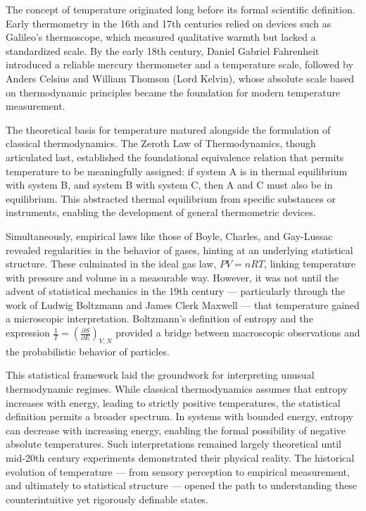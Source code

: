 \begin{historical}
The concept of temperature originated long before its formal scientific definition. Early thermometry in the 16th and 17th centuries relied on devices such as Galileo’s thermoscope, which measured qualitative warmth but lacked a standardized scale. By the early 18th century, Daniel Gabriel Fahrenheit introduced a reliable mercury thermometer and a temperature scale, followed by Anders Celsius and William Thomson (Lord Kelvin), whose absolute scale based on thermodynamic principles became the foundation for modern temperature measurement.

The theoretical basis for temperature matured alongside the formulation of classical thermodynamics. The Zeroth Law of Thermodynamics, though articulated last, established the foundational equivalence relation that permits temperature to be meaningfully assigned: if system A is in thermal equilibrium with system B, and system B with system C, then A and C must also be in equilibrium. This abstracted thermal equilibrium from specific substances or instruments, enabling the development of general thermometric devices.

Simultaneously, empirical laws like those of Boyle, Charles, and Gay-Lussac revealed regularities in the behavior of gases, hinting at an underlying statistical structure. These culminated in the ideal gas law, \( PV = nRT \), linking temperature with pressure and volume in a measurable way. However, it was not until the advent of statistical mechanics in the 19th century — particularly through the work of Ludwig Boltzmann and James Clerk Maxwell — that temperature gained a microscopic interpretation. Boltzmann’s definition of entropy and the expression \( \frac{1}{T} = \left(\frac{\partial S}{\partial E}\right)_{V,N} \) provided a bridge between macroscopic observations and the probabilistic behavior of particles.

This statistical framework laid the groundwork for interpreting unusual thermodynamic regimes. While classical thermodynamics assumes that entropy increases with energy, leading to strictly positive temperatures, the statistical definition permits a broader spectrum. In systems with bounded energy, entropy can decrease with increasing energy, enabling the formal possibility of negative absolute temperatures. Such interpretations remained largely theoretical until mid-20th century experiments demonstrated their physical reality. The historical evolution of temperature — from sensory perception to empirical measurement, and ultimately to statistical structure — opened the path to understanding these counterintuitive yet rigorously definable states.
\end{historical}
